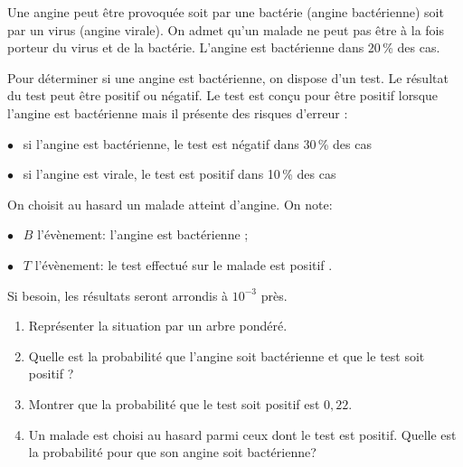 \medskip

Une angine peut être provoquée soit par une bactérie (angine bactérienne) soit par un virus (angine virale). On admet qu'un malade ne peut pas être à la fois porteur du virus et de la bactérie. L'angine est bactérienne dans 20\,\% des cas.

Pour déterminer si une angine est bactérienne, on dispose d'un test. Le résultat du test peut être positif ou négatif. Le test est conçu pour être positif lorsque l'angine est bactérienne mais il présente des risques d'erreur :

\medskip

$\bullet~~$ si l'angine est bactérienne, le test est négatif dans 30\,\% des cas

$\bullet~~$ si l'angine est virale, le test est positif dans 10\,\% des cas

\medskip

On choisit au hasard un malade atteint d'angine. On note:

$\bullet~~$ $B$ l'évènement: \og l'angine est bactérienne \fg{} ;

$\bullet~~$ $T$ l'évènement: \og le test effectué sur le malade est positif \fg. 

\medskip

Si besoin, les résultats seront arrondis à $10^{-3}$ près.

\medskip

\begin{enumerate}
\item Représenter la situation par un arbre pondéré.
\item Quelle est la probabilité que l'angine soit bactérienne et que le test soit positif ?
\item Montrer que la probabilité que le test soit positif est $0,22$.
\item Un malade est choisi au hasard parmi ceux dont le test est positif. Quelle est la
probabilité pour que son angine soit bactérienne?
\end{enumerate}
